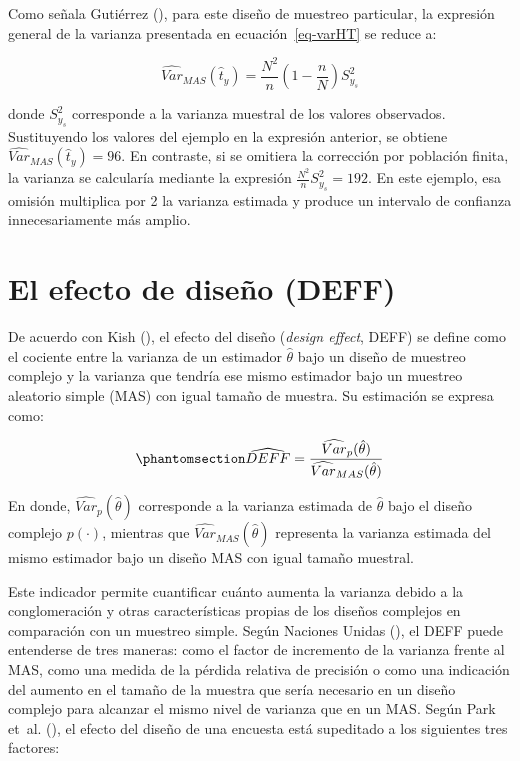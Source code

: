 \documentclass[
  spanish,
  11pt,
  letterpaper,
  oneside,
  open=any]{scrbook}
\begin{document}
Como señala Gutiérrez (), para este
diseño de muestreo particular, la expresión general de la varianza
presentada en ecuación~\ref{eq-varHT} se reduce a:

\[\widehat{Var}_{MAS}(\hat{t}_{y}) = \frac{N^2}{n}\left(1-\frac{n}{N}\right)S_{y_s}^2\]

donde \(S_{y_s}^2\) corresponde a la varianza muestral de los valores
observados. Sustituyendo los valores del ejemplo en la expresión
anterior, se obtiene \(\widehat{Var}_{MAS}(\hat{t}_{y})= 96\). En
contraste, si se omitiera la corrección por población finita, la
varianza se calcularía mediante la expresión
\(\frac{N^2}{n}S_{y_s}^2 = 192\). En este ejemplo, esa omisión
multiplica por 2 la varianza estimada y produce un intervalo de
confianza innecesariamente más amplio.

\section{El efecto de diseño (DEFF)}\label{el-efecto-de-diseuxf1o-deff}

De acuerdo con Kish (), el
efecto del diseño (\emph{design effect}, DEFF) se define como el
cociente entre la varianza de un estimador \(\hat{\theta}\) bajo un
diseño de muestreo complejo y la varianza que tendría ese mismo
estimador bajo un muestreo aleatorio simple (MAS) con igual tamaño de
muestra. Su estimación se expresa como:

\begin{equation}\protect\phantomsection\label{eq-deff}{\widehat{{DEFF}} = \frac{\widehat{Var}_{p}(\hat{\theta})}{\widehat{Var}_{MAS}(\hat{\theta})}}\end{equation}

En donde, \(\widehat{Var}_{p}(\hat{\theta})\) corresponde a la varianza
estimada de \(\hat{\theta}\) bajo el diseño complejo \(p(\cdot)\),
mientras que \(\widehat{Var}_{MAS}(\hat{\theta})\) representa la
varianza estimada del mismo estimador bajo un diseño MAS con igual
tamaño muestral.

Este indicador permite cuantificar cuánto aumenta la varianza debido a
la conglomeración y otras características propias de los diseños
complejos en comparación con un muestreo simple. Según Naciones Unidas
(), el DEFF puede entenderse de tres
maneras: como el factor de incremento de la varianza frente al MAS, como
una medida de la pérdida relativa de precisión o como una indicación del
aumento en el tamaño de la muestra que sería necesario en un diseño
complejo para alcanzar el mismo nivel de varianza que en un MAS. Según
Park et~al. (), el efecto del diseño
de una encuesta está supeditado a los siguientes tres factores:
\end{document}
